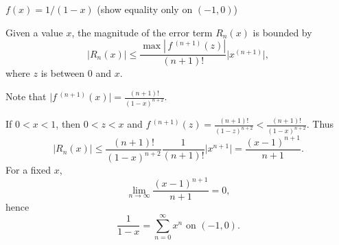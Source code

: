 {$f(x) = 1/(1-x)$ (show equality only on $(-1,0)$)
}
{Given a value $x$, the magnitude of the error term $R_n(x)$ is bounded by
$$ \big|R_n(x)\big| \leq \frac{\max\left|\,f\,^{(n+1)}(z)\right|}{(n+1)!}\big|x^{(n+1)}\big|,$$
where $z$ is between $0$ and $x$. 

Note that $\big|f\,^{(n+1)}(x)\big| = \frac{(n+1)!}{(1-x)^{n+2}}$. 


If $0<x<1$, then $0<z<x$ and $f\,^{(n+1)}(z) =\frac{(n+1)!}{(1-z)^{n+2}}<\frac{(n+1)!}{(1-x)^{n+2}}$.
Thus
$$ \big|R_n(x)\big| \leq \frac{(n+1)!}{(1-x)^{n+2}}\frac{1}{(n+1)!}\big|x^{n+1}\big|= \frac{(x-1)^{n+1}}{n+1}.$$
For a fixed $x$,
$$\lim_{n\to\infty} \frac{(x-1)^{n+1}}{n+1}=0,$$
hence
$$\frac{1}{1-x} = \sum_{n=0}^\infty x^n \text{ on } (-1,0).$$
 



}